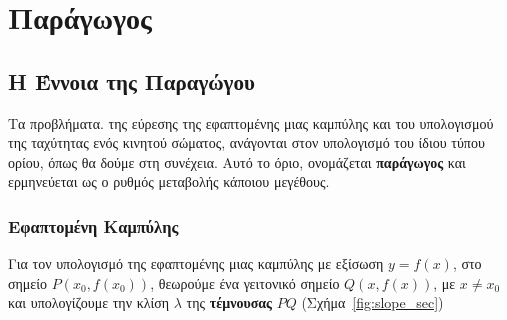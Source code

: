 \chapter*{Παράγωγος}


\section*{Η Έννοια της Παραγώγου}

Τα προβλήματα. της εύρεσης της εφαπτομένης μιας καμπύλης και του υπολογισμού της 
ταχύτητας ενός κινητού σώματος, ανάγονται στον υπολογισμό του ίδιου τύπου ορίου, 
όπως θα δούμε στη συνέχεια. Αυτό το όριο, ονομάζεται \textbf{παράγωγος} και ερμηνεύεται 
ως ο ρυθμός μεταβολής κάποιου μεγέθους.

\subsection*{Εφαπτομένη Καμπύλης}

Για τον υπολογισμό της εφαπτομένης μιας καμπύλης με εξίσωση $ y=f(x) $, στο 
σημείο $P( x_{0}, f(x_{0})) $, θεωρούμε ένα γειτονικό σημείο $ Q(x,f(x)) $, με 
$ x \neq x_{0} $ και υπολογίζουμε την κλίση $\lambda$ της \textbf{τέμνουσας} $ PQ $
(Σχήμα~\ref{fig:slope_sec})

